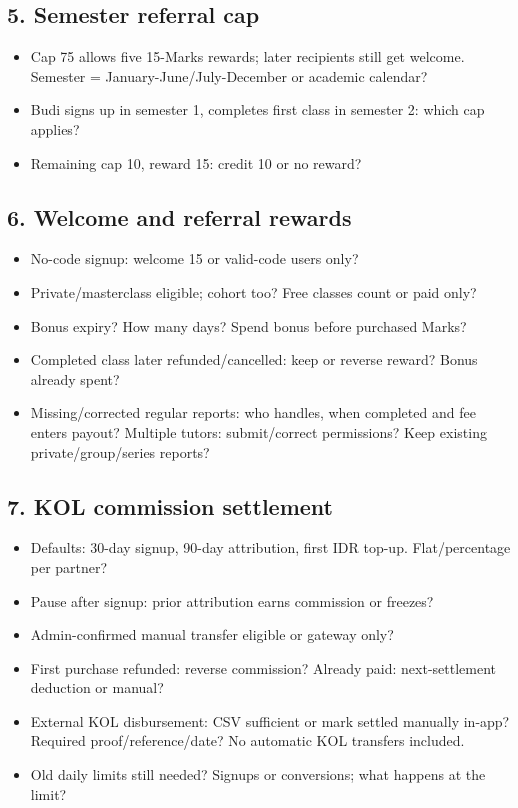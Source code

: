 \documentclass[11pt,a4paper]{article}
\begin{document}
\subsection*{5. Semester referral cap}

\begin{itemize}
\item Cap 75 allows five 15-Marks rewards; later recipients still get welcome. Semester = January-June/\allowbreak{}July-December or academic calendar?
\item Budi signs up in semester 1, completes first class in semester 2: which cap applies?
\item Remaining cap 10, reward 15: credit 10 or no reward?
\end{itemize}

\subsection*{6. Welcome and referral rewards}

\begin{itemize}
\item No-code signup: welcome 15 or valid-code users only?
\item Private/\allowbreak{}masterclass eligible; cohort too? Free classes count or paid only?
\item Bonus expiry? How many days? Spend bonus before purchased Marks?
\item Completed class later refunded/\allowbreak{}cancelled: keep or reverse reward? Bonus already spent?
\item Missing/\allowbreak{}corrected regular reports: who handles, when completed and fee enters payout? Multiple tutors: submit/\allowbreak{}correct permissions? Keep existing private/\allowbreak{}group/\allowbreak{}series reports?
\end{itemize}

\subsection*{7. KOL commission settlement}

\begin{itemize}
\item Defaults: 30-day signup, 90-day attribution, first IDR top-up. Flat/\allowbreak{}percentage per partner?
\item Pause after signup: prior attribution earns commission or freezes?
\item Admin-confirmed manual transfer eligible or gateway only?
\item First purchase refunded: reverse commission? Already paid: next-settlement deduction or manual?
\item External KOL disbursement: CSV sufficient or mark settled manually in-app? Required proof/\allowbreak{}reference/\allowbreak{}date? No automatic KOL transfers included.
\item Old daily limits still needed? Signups or conversions; what happens at the limit?
\end{itemize}
\end{document}
